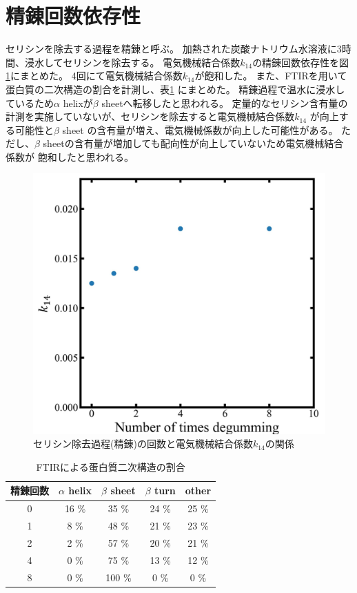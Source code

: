 \documentclass[dvipdfmx,12pt,a4paper]{jreport}
\begin{document}
		\section{精錬回数依存性}
		セリシンを除去する過程を精錬と呼ぶ。
		加熱された炭酸ナトリウム水溶液に3時間、浸水してセリシンを除去する。
		電気機械結合係数$k_{14}$の精錬回数依存性を図\ref{times_k}にまとめた。
		4回にて電気機械結合係数$k_{14}$が飽和した。
		また、FTIRを用いて蛋白質の二次構造の割合を計測し、表\ref{FTIR_蛋白質二次構造_セリシン除去回数}
		にまとめた。
		精錬過程で温水に浸水しているため$\alpha$ helixが$\beta$ sheetへ転移したと思われる。
		定量的なセリシン含有量の計測を実施していないが、セリシンを除去すると電気機械結合係数$k_{14}$
		が向上する可能性と$\beta$ sheet の含有量が増え、電気機械係数が向上した可能性がある。
		ただし、$\beta$ sheetの含有量が増加しても配向性が向上していないため電気機械結合係数が
		飽和したと思われる。
		\begin{figure}[h]
			\centering
			\includegraphics[scale=0.5]{number_k.jpg}
			\caption{セリシン除去過程(精錬)の回数と電気機械結合係数$k_{14}$の関係}
			\label{times_k}
		\end{figure}
		\begin{table}[h]
			\centering
			\caption{FTIRによる蛋白質二次構造の割合}
			\label{FTIR_蛋白質二次構造_セリシン除去回数}
			\begin{tabular}{c c c c c} \hline
				精錬回数 & $\alpha$ helix & $\beta$ sheet &$\beta$ turn & other \\ \hline \hline
				0 & 16 \% & 35 \% &  24 \% & 25 \% \\
				1 & 8 \% & 48 \% &  21 \% & 23 \% \\
				2 &  2 \% & 57 \% & 20 \% & 21 \% \\
				4 & 0 \% & 75 \% & 13 \% & 12 \% \\ 
				8 & 0 \% & 100 \% & 0 \% & 0 \% \\ \hline
			\end{tabular}
		\end{table}
		\newpage
\end{document}
